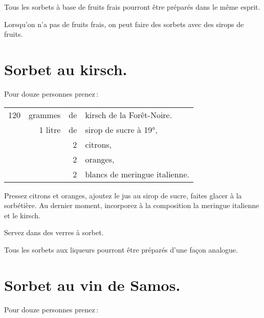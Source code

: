 \sk

Tous les sorbets à base de fruits frais pourront être préparés dans le même esprit.

\medskip

Lorsqu'on n'a pas de fruits frais, on peut faire des sorbets avec des sirops de fruits.

\section*{\centering Sorbet au kirsch.}
{}

Pour douze personnes prenez :

\footnotesize
\begin{longtable}{rrrp{16em}}
    120 & grammes & de & kirsch de la Forêt-Noire.                                                        \\
        & 1 litre & de & sirop de sucre à 19°,                                                            \\
        &         &  2 & citrons,                                                                         \\
        &         &  2 & oranges,                                                                         \\
        &         &  2 & blancs de meringue italienne.                                                    \\
\end{longtable}
\normalsize

Pressez citrons et oranges, ajoutez le jus au sirop de sucre, faites glacer
à la sorbétière. Au dernier moment, incorporez à la composition la meringue
italienne et le kirsch.

Servez dans des verres à sorbet.

\sk

Tous les sorbets aux liqueurs pourront être préparés d'une façon analogue.

\section*{\centering Sorbet au vin de Samos.}
{}

Pour douze personnes prenez :


